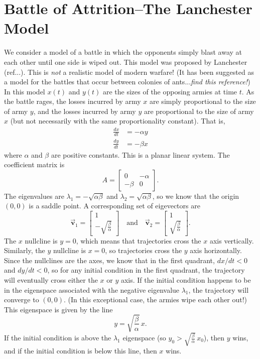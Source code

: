 \documentclass[reqno]{immbook}
\newcommand{\BV}{\vec{\textbf{v}}}
\begin{document}
\section{Battle of Attrition--The Lanchester Model}
%
We consider a model of a battle in which the opponents
simply blast away at each other until one side is wiped
out.
This model was proposed by Lanchester (ref...).
This is \emph{not} a realistic model of modern warfare!
(It has been suggested as a model for the battles that
occur between colonies of ants...\emph{find this reference!})
In this model $x(t)$ and $y(t)$ are the sizes of the
opposing armies at time $t$.
As the battle rages, the losses incurred by army $x$
are simply proportional to the size of army $y$,
and the losses incurred by army $y$ are proportional
to the size of army $x$ (but not necessarily with
the same proportionality constant).
That is,
\begin{equation}
\begin{split}
   \frac{dx}{dt} & = - \alpha y \\
   \frac{dy}{dt} & = - \beta x
\end{split}
\end{equation}
where $\alpha$ and $\beta$ are positive constants.
This is a planar linear system.
The coefficient matrix is
\begin{equation}
  A = \begin{bmatrix} 0 & -\alpha \\ -\beta & 0 \end{bmatrix}.
\end{equation}
The eigenvalues are $\lambda_1 = -\sqrt{\alpha\beta}$
and $\lambda_2 = \sqrt{\alpha\beta}$,
so we know that the origin $(0,0)$ is a saddle point.
A corresponding set of eigevectors are
\[
  \BV_1 = \begin{bmatrix} 1 \\ -\sqrt{\frac{\beta}{\alpha}}\end{bmatrix}
  \quad \textrm{and}\quad
  \BV_2 = \begin{bmatrix} 1 \\ \sqrt{\frac{\beta}{\alpha}}\end{bmatrix}.
\]
The $x$ nullcline is $y=0$, which means that trajectories
cross the $x$ axis vertically. Similarly, the $y$ nullcline is
$x=0$, so trajectories cross the $y$ axis horizontally.
Since the nullclines are the axes, we know that in the first
quadrant, $dx/dt < 0$ and $dy/dt < 0$, so for any initial
condition in the first quadrant, the trajectory will eventually
cross either the $x$ or $y$ axis. If the initial condition
happens to be in the eigenspace associated with the negative
eigenvalue $\lambda_1$, the trajectory will converge to
$(0,0)$. (In this exceptional case, the armies wipe each
other out!)
This eigenspace is given by the line
\begin{equation}
  y = \sqrt{\frac{\beta}{\alpha}}\, x.
\end{equation}
If the initial condition is above the $\lambda_1$ eigenspace
(so $y_0 > \sqrt{\frac{\beta}{\alpha}}\, x_0$), then
$y$ wins, and if the initial condition is below this line,
then $x$ wins.
\end{document}
